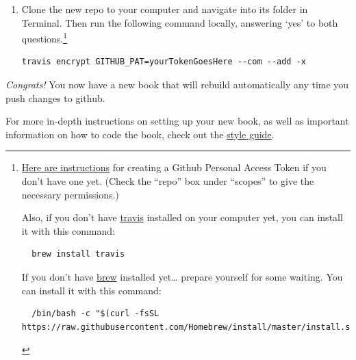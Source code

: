 \documentclass[
]{book}
\begin{document}
\begin{enumerate}
\def\labelenumi{\arabic{enumi}.}
\setcounter{enumi}{2}
\item
  Clone the new repo to your computer and navigate into its folder in Terminal. Then run the following command locally, answering `yes' to both questions.\footnote{\href{https://docs.github.com/en/free-pro-team@latest/github/authenticating-to-github/creating-a-personal-access-token}{Here are instructions} for creating a Github Personal Access Token if you don't have one yet. (Check the ``repo'' box under ``scopes'' to give the necessary permissions.)

    Also, if you don't have \href{https://github.com/travis-ci/travis.rb\#installation}{travis} installed on your computer yet, you can install it with this command:

\begin{Verbatim}
  brew install travis
\end{Verbatim}

    If you don't have \href{https://brew.sh}{brew} installed yet\ldots{} prepare yourself for some waiting. You can install it with this command:

\begin{Verbatim}
  /bin/bash -c "$(curl -fsSL https://raw.githubusercontent.com/Homebrew/install/master/install.sh)"
\end{Verbatim}
  }

\begin{verbatim}
travis encrypt GITHUB_PAT=yourTokenGoesHere --com --add -x
\end{verbatim}
\end{enumerate}

\emph{Congrats!} You now have a new book that will rebuild automatically any time you push changes to github.

For more in-depth instructions on setting up your new book, as well as important information on how to code the book, check out the \href{https://warhornmedia.github.io/style-guide}{style guide}.
\end{document}
